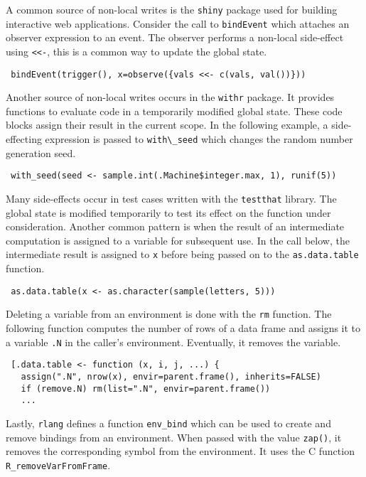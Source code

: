 \documentclass[review,nonacm,screen,acmsmall,anonymous=true]{acmart}
\newcommand{\code}[1]{\lstinline |#1|\xspace}
\renewcommand{\c}[1]{\lstinline |#1|\xspace}
\begin{document}
A common source of non-local writes is the \c{shiny} package used for building
interactive web applications. Consider the call to \code{bindEvent} which
attaches an observer expression to an event. The observer performs a non-local
side-effect using \code{<<-}, this is a common way to update the global state.
%
\begin{lstlisting}
 bindEvent(trigger(), x=observe({vals <<- c(vals, val())}))
\end{lstlisting}
%
\noindent
Another source of non-local writes occurs in the \code{withr} package. It
provides functions to evaluate code in a temporarily modified global state. These
code blocks assign their result in the current scope. In the following example, a
side-effecting expression is passed to \code{with\_seed} which changes the
random number generation seed.
%
\begin{lstlisting}
 with_seed(seed <- sample.int(.Machine$integer.max, 1), runif(5))
\end{lstlisting}
%
\noindent
Many side-effects occur in test cases written with the \code{testthat} library.
The global state is modified temporarily to test its effect on the function
under consideration.
%
Another common pattern is when the result of an intermediate computation is
assigned to a variable for subsequent use. In the call below, the intermediate
result is assigned to \code{x} before being passed on to the
\code{as.data.table} function.
%
\begin{lstlisting}
 as.data.table(x <- as.character(sample(letters, 5)))
\end{lstlisting}
%
\noindent
Deleting a variable from an environment is done with the \code{rm} function.
The following function computes the number of rows of a data frame and assigns
it to a variable \code{.N} in the caller's environment. Eventually, it removes the
variable.
%
\begin{lstlisting}
 [.data.table <- function (x, i, j, ...) {
   assign(".N", nrow(x), envir=parent.frame(), inherits=FALSE)
   if (remove.N) rm(list=".N", envir=parent.frame())
   ...
\end{lstlisting}
\noindent
Lastly, \code{rlang} defines a function \code{env_bind} which can be used to
create and remove bindings from an environment. When passed with the value
\code{zap()}, it removes the corresponding symbol from the environment. It uses
the C function \code{R_removeVarFromFrame}.
\end{document}
